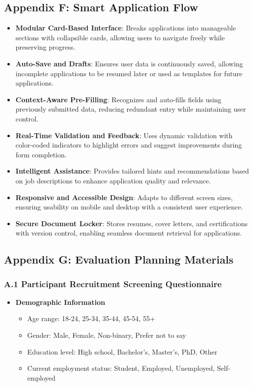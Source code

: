 \documentclass[
	letterpaper, %
]{jdf}
\begin{document}
\begin{sloppypar}
\hfill \break
\subsection{Appendix F: Smart Application Flow}
\begin{itemize}
    \item \textbf{Modular Card-Based Interface}: Breaks applications into manageable sections with collapsible cards, allowing users to navigate freely while preserving progress.
    \item \textbf{Auto-Save and Drafts}: Ensures user data is continuously saved, allowing incomplete applications to be resumed later or used as templates for future applications.
    \item \textbf{Context-Aware Pre-Filling}: Recognizes and auto-fills fields using previously submitted data, reducing redundant entry while maintaining user control.
    \item \textbf{Real-Time Validation and Feedback}: Uses dynamic validation with color-coded indicators to highlight errors and suggest improvements during form completion.
    \item \textbf{Intelligent Assistance}: Provides tailored hints and recommendations based on job descriptions to enhance application quality and relevance.
    \item \textbf{Responsive and Accessible Design}: Adapts to different screen sizes, ensuring usability on mobile and desktop with a consistent user experience.
    \item \textbf{Secure Document Locker}: Stores resumes, cover letters, and certifications with version control, enabling seamless document retrieval for applications.
\end{itemize}

\subsection{Appendix G: Evaluation Planning Materials}

\subsubsection{A.1 Participant Recruitment Screening Questionnaire}

\begin{itemize}
    \item \textbf{Demographic Information}
    \begin{itemize}
        \item Age range: 18-24, 25-34, 35-44, 45-54, 55+
        \item Gender: Male, Female, Non-binary, Prefer not to say
        \item Education level: High school, Bachelor's, Master's, PhD, Other
        \item Current employment status: Student, Employed, Unemployed, Self-employed
    \end{itemize}
    

\end{itemize}
\end{sloppypar}
\end{document}
